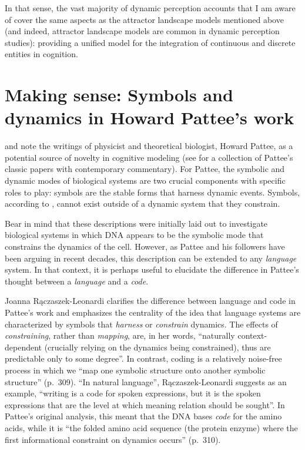 In that sense, the vast majority of dynamic perception accounts that I am aware of cover the same aspects as the attractor landscape models mentioned above (and indeed, attractor landscape models are common in dynamic perception studies): providing a unified model for the integration of continuous and discrete entities in cognition.

\section{Making sense: Symbols and dynamics in Howard Pattee's work}\label{sec:pattee}

\citet{cariani2001symbols} and \citet{raczaszek2008reconciling} note the writings of physicist and theoretical biologist, Howard Pattee, as a potential source of novelty in cognitive modeling (see \citealt{pattee2012lawssk} for a collection of Pattee's classic papers with contemporary commentary).
For Pattee, the symbolic and dynamic modes of biological systems are two crucial components with specific roles to play:
symbols are the stable forms that harness dynamic events. Symbols, according to \citet[337]{pattee1987instabilities}, cannot exist outside of a dynamic system that they constrain.

Bear in mind that these descriptions were initially laid out to investigate biological systems in which DNA appears to be the symbolic mode that constrains the dynamics of the cell.
However, as Pattee and his followers have been arguing in recent decades, this description can be extended to any \emph{language} system. In that context, it is perhaps useful to elucidate the difference in Pattee's thought between a \emph{language} and a \emph{code}.

Joanna Rączaszek-Leonardi clarifies the difference between language and code in Pattee's work \citep[307--310]{pattee2012lawssk} and emphasizes the centrality of the idea that language systems are characterized by symbols that \emph{harness} or \emph{constrain} dynamics.
The effects of \emph{constraining}, rather than \emph{mapping}, are, in her words, \enquote{naturally context-dependent (crucially relying on the dynamics being constrained), thus are predictable only to some degree}.
In contrast, coding is a relatively noise-free process in which we \enquote{map one symbolic structure onto another symbolic structure} (p.~309).
\enquote{In natural language}, Rączaszek-Leonardi suggests as an example, \enquote{writing is a code for spoken expressions, but it is the spoken expressions that are the level at which meaning relation should be sought}.
In Pattee's original analysis, this meant that the DNA bases \emph{code} for the amino acids, while it is \enquote{the folded amino acid sequence (the protein enzyme) where the first informational constraint on dynamics occurs} (p.~310).

